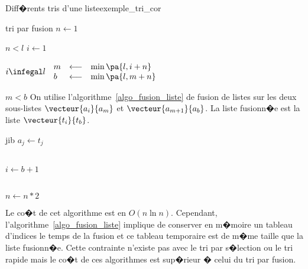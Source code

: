\begin{xexempleprog2}{Diff�rents tris d'une liste}{exemple_tri_cor}
\begin{xalgorithm}{tri par fusion}
                $n \longleftarrow 1$ \\
                \begin{xwhile2}{$n < l$}
                        $i \longleftarrow 1$ \\
                        \begin{xwhile2}{$i \infegal l$}
                            $\begin{array}{lll}
                            m &\longleftarrow& \min\pa{l, i + n} \\
                            b &\longleftarrow& \min\pa{l, m + n}
                            \end{array}$ \\
                            \begin{xif}{$m < b$}
                                    On utilise l'algorithme~\ref{algo_fusion_liste} de fusion de listes sur les deux sous-listes
                                    $\vecteur{a_i}{a_{m}}$ et $\vecteur{a_{m+1}}{a_{b}}$. La liste fusionn�e est la liste
                                    $\vecteur{t_i}{t_{b}}$. \\
                                    \begin{xfor}{j}{i}{b}
                                    $a_j \longleftarrow t_j$
                                    \end{xfor}
                            \end{xif}\\
                            $i \longleftarrow b+1$
                        \end{xwhile2} \\
                        $n \longleftarrow n * 2$
                \end{xwhile2}
            
                \end{xalgorithm}
                
                
Le co�t de cet algorithme est en $O(n \ln n)$. Cependant, l'algorithme~\ref{algo_fusion_liste} implique de conserver en m�moire un tableau d'indices le temps de la fusion et ce tableau temporaire est de m�me taille que la liste fusionn�e. Cette contrainte n'existe pas avec le tri par s�lection ou le tri rapide mais le co�t de ces algorithmes est sup�rieur � celui du tri par fusion.


\label{par_tri_insertion}


\end{xexempleprog2}
